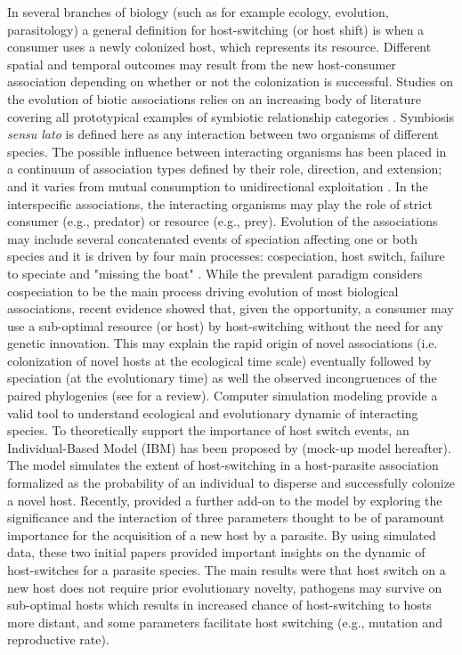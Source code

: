 In several branches of biology (such as for example  ecology, evolution, parasitology) a general definition for host-switching (or host shift) is when a consumer uses a newly colonized host, which represents its resource. Different spatial and temporal outcomes may result from the new host-consumer association depending on whether or not the colonization is successful. Studies on the evolution of biotic associations relies on an increasing body of literature covering all prototypical examples of symbiotic relationship categories \citep{thompson_four_2010}.
Symbiosis \emph{sensu lato} is defined here as any interaction between two organisms of different species. The possible influence between interacting organisms has been placed in a continuum of association types defined by their role, direction, and extension; and it varies from mutual consumption to unidirectional exploitation \citep{dimijian_evolving_2000,dimijian_evolving_2000-1}. In the interspecific associations, the interacting organisms may play the role of strict consumer (e.g., predator) or resource (e.g., prey). Evolution of the associations may include several concatenated events of speciation affecting one or both species and it is driven by four main processes: cospeciation, host switch, failure to speciate and "missing the boat" \citep{page_introduction_2002}. While the prevalent paradigm considers cospeciation to be the main process driving evolution of most biological associations, recent evidence showed that, given the opportunity, a consumer may use a sub-optimal resource (or host) by host-switching without the need for any genetic innovation. This may explain the rapid origin of novel associations (i.e. colonization of novel hosts at the ecological time scale) eventually followed by speciation (at the evolutionary time) as well the observed incongruences of the paired phylogenies (see \citet{brooks_stockholm_2019} for a review). Computer simulation modeling provide a valid tool to understand ecological and evolutionary dynamic of interacting species.
To theoretically support the importance of host switch events, an Individual-Based Model (IBM) has been proposed by
\citet{araujo_understanding_2015} (mock-up model hereafter). The model simulates the extent of host-switching in a host-parasite association formalized as the probability of an individual to disperse and successfully colonize a novel host. Recently, \citet{feronato_accidents_2021} provided a further add-on to the model by exploring the significance and the interaction of three parameters thought to be of paramount importance for the acquisition of a new host by a parasite. By using simulated data, these two initial papers provided important insights on the dynamic of host-switches for a parasite species. The main results were that host switch on a new host does not require prior evolutionary novelty, pathogens may survive on sub-optimal hosts which results in increased chance of host-switching to hosts more distant, and some parameters facilitate host switching (e.g., mutation and reproductive rate).

